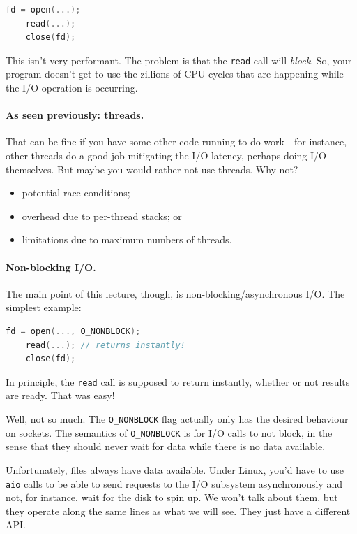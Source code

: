 \documentclass[a4paper]{report}
\begin{document}
\begin{lstlisting}[language=C]
    fd = open(...);
    read(...);
    close(fd);
\end{lstlisting}

This isn't very performant. The problem is that the {\tt read} call will
{\em block}. So, your program doesn't get to use the zillions of CPU cycles that
are happening while the I/O operation is occurring.

\paragraph{As seen previously: threads.} That can be fine if
you have some other code running to do work---for instance, other threads
do a good job mitigating the I/O latency, perhaps doing I/O themselves.
But maybe you would rather not use threads. Why not?

\begin{itemize}
\item potential race conditions;
\item overhead due to per-thread stacks; or
\item limitations due to maximum numbers of threads.
\end{itemize}

\paragraph{Non-blocking I/O.} The main point of this lecture, though,
is non-blocking/asynchronous I/O. The simplest example:

\begin{lstlisting}[language=C]
    fd = open(..., O_NONBLOCK);
    read(...); // returns instantly!
    close(fd);
\end{lstlisting}

In principle, the {\tt read} call is supposed to return instantly,
whether or not results are ready. That was easy!

Well, not so much. The {\tt O\_NONBLOCK} flag actually only has the
desired behaviour on sockets. The semantics of {\tt O\_NONBLOCK} is
for I/O calls to not block, in the sense that they should never wait
for data while there is no data available.

Unfortunately, files always have data available. Under Linux, you'd have
to use {\tt aio} calls to be able to send requests to the I/O subsystem
asynchronously and not, for instance, wait for the disk to spin up.
We won't talk about them, but they operate along the same lines as what
we will see. They just have a different API.
\end{document}
